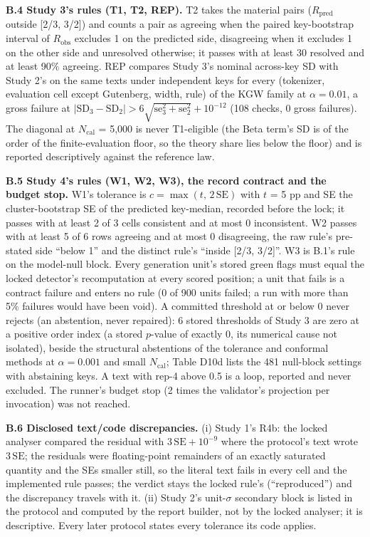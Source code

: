 \documentclass[11pt,letterpaper]{article}
\begin{document}
\textbf{B.4 Study 3's rules (T1, T2, REP).} T2 takes the material pairs (\(R_{\mathrm{pred}}\) outside {[}2/3, 3/2{]}) and counts a pair as agreeing when the paired key-bootstrap interval of \(R_{\mathrm{obs}}\) excludes 1 on the predicted side, disagreeing when it excludes 1 on the other side and unresolved otherwise; it passes with at least 30 resolved and at least 90\% agreeing. REP compares Study 3's nominal across-key SD with Study 2's on the same texts under independent keys for every (tokenizer, evaluation cell except Gutenberg, width, rule) of the KGW family at \(\alpha = 0.01\), a gross failure at \(|\mathrm{SD}_3 - \mathrm{SD}_2| > 6\sqrt{\mathrm{se}_3^2 + \mathrm{se}_2^2} + 10^{-12}\) (108 checks, 0 gross failures). The diagonal at \(N_{\mathrm{cal}}\) = 5,000 is never T1-eligible (the Beta term's SD is of the order of the finite-evaluation floor, so the theory share lies below the floor) and is reported descriptively against the reference law.

\textbf{B.5 Study 4's rules (W1, W2, W3), the record contract and the budget stop.} W1's tolerance is \(c = \max(t,\, 2\,\mathrm{SE})\) with \(t\) = 5 pp and SE the cluster-bootstrap SE of the predicted key-median, recorded before the lock; it passes with at least 2 of 3 cells consistent and at most 0 inconsistent. W2 passes with at least 5 of 6 rows agreeing and at most 0 disagreeing, the raw rule's pre-stated side ``below 1'' and the distinct rule's ``inside {[}2/3, 3/2{]}''. W3 is B.1's rule on the model-null block. Every generation unit's stored green flags must equal the locked detector's recomputation at every scored position; a unit that fails is a contract failure and enters no rule (0 of 900 units failed; a run with more than 5\% failures would have been void). A committed threshold at or below 0 never rejects (an abstention, never repaired): 6 stored thresholds of Study 3 are zero at a positive order index (a stored \(p\)-value of exactly 0, its numerical cause not isolated), beside the structural abstentions of the tolerance and conformal methods at \(\alpha = 0.001\) and small \(N_{\mathrm{cal}}\); Table D10d lists the 481 null-block settings with abstaining keys. A text with rep-4 above 0.5 is a loop, reported and never excluded. The runner's budget stop (2 times the validator's projection per invocation) was not reached.

\textbf{B.6 Disclosed text/code discrepancies.} (i) Study 1's R4b: the locked analyser compared the residual with \(3\,\mathrm{SE} + 10^{-9}\) where the protocol's text wrote \(3\,\mathrm{SE}\); the residuals were floating-point remainders of an exactly saturated quantity and the SEs smaller still, so the literal text fails in every cell and the implemented rule passes; the verdict stays the locked rule's (``reproduced'') and the discrepancy travels with it. (ii) Study 2's unit-\(\sigma\) secondary block is listed in the protocol and computed by the report builder, not by the locked analyser; it is descriptive. Every later protocol states every tolerance its code applies.
\end{document}
